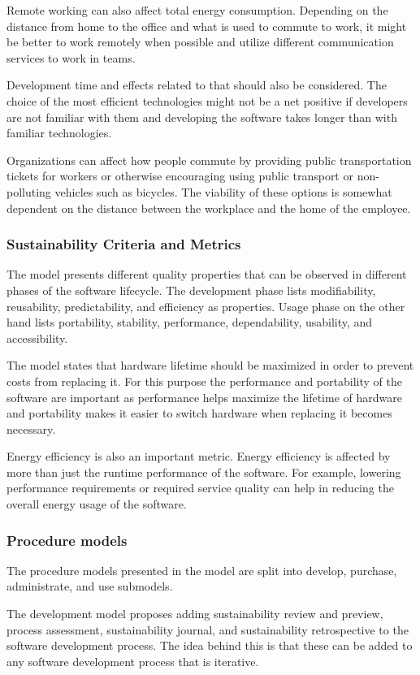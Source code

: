 Remote working can also affect total energy consumption. Depending on the distance from home to the office and what is used to commute to work, it might be better to work remotely when possible and utilize different communication services to work in teams.

Development time and effects related to that should also be considered. The choice of the most efficient technologies might not be a net positive if developers are not familiar with them and developing the software takes longer than with familiar technologies.

Organizations can affect how people commute by providing public transportation tickets for workers or otherwise encouraging using public transport or non-polluting vehicles such as bicycles. The viability of these options is somewhat dependent on the distance between the workplace and the home of the employee.

\subsubsection{Sustainability Criteria and Metrics}
The model presents different quality properties that can be observed in different phases of the software lifecycle. The development phase lists modifiability, reusability, predictability, and efficiency as properties. Usage phase on the other hand lists portability, stability, performance, dependability, usability, and accessibility.

The model states that hardware lifetime should be maximized in order to prevent costs from replacing it. For this purpose the performance and portability of the software are important as performance helps maximize the lifetime of hardware and portability makes it easier to switch hardware when replacing it becomes necessary.

Energy efficiency is also an important metric. Energy efficiency is affected by more than just the runtime performance of the software. For example, lowering performance requirements or required service quality can help in reducing the overall energy usage of the software.~\cite{greensoft}

\subsubsection{Procedure models}
The procedure models presented in the model are split into develop, purchase, administrate, and use submodels.

The development model proposes adding sustainability review and preview, process assessment, sustainability journal, and sustainability retrospective to the software development process. The idea behind this is that these can be added to any software development process that is iterative.

